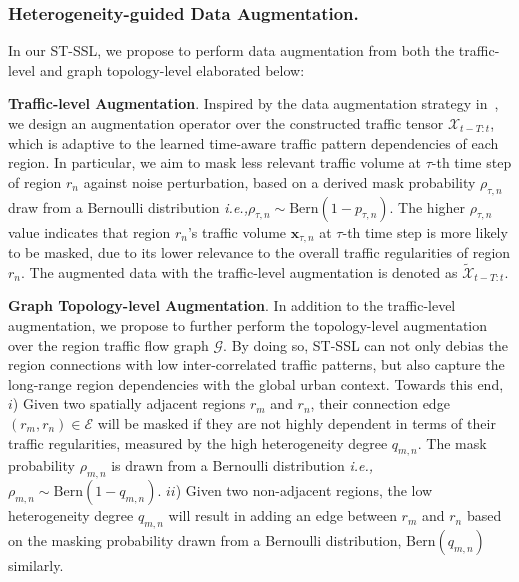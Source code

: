 \documentclass[letterpaper]{article} \usepackage{aaai23}  \usepackage{times}  \usepackage{helvet}  \usepackage{courier}  \usepackage[hyphens]{url}  \usepackage{graphicx} \urlstyle{rm} \def\UrlFont{\rm}  \usepackage{natbib}  \usepackage{caption} \frenchspacing  \setlength{\pdfpagewidth}{8.5in} \setlength{\pdfpageheight}{11in}
\newcommand{\ie}{\emph{i.e.,}\xspace}
\newcommand{\name}{ST-SSL\xspace}
\begin{document}
\subsubsection{Heterogeneity-guided Data Augmentation.}


In our \name, we propose to perform data augmentation from both the traffic-level and graph topology-level elaborated below:\\\vspace{-0.12in}



\noindent \textbf{Traffic-level Augmentation}. Inspired by the data augmentation strategy in~\cite{zhu2021graph}, we design an augmentation operator over the constructed traffic tensor $\mathcal{X}_{t-T:t}$, which is adaptive to the learned time-aware traffic pattern dependencies of each region. In particular, we aim to mask less relevant traffic volume at $\tau$-th time step of region $r_n$ against noise perturbation, based on a derived mask probability ${\rho}_{\tau,n}$ draw from a Bernoulli distribution \ie ${\rho}_{\tau,n} \sim \mathrm{Bern}(1-p_{\tau,n})$. The higher ${\rho}_{\tau,n}$ value indicates that region $r_n$'s traffic volume $\bm x_{\tau, n}$ at $\tau$-th time step is more likely to be masked, due to its lower relevance to the overall traffic regularities of region $r_n$. The augmented data with the traffic-level augmentation is denoted as $\tilde{\mathcal{X}}_{t-T:t}$.\\\vspace{-0.12in}



\noindent \textbf{Graph Topology-level Augmentation}.
In addition to the traffic-level augmentation, we propose to further perform the topology-level augmentation over the region traffic flow graph $\mathcal{G}$. By doing so, \name can not only debias the region connections with low inter-correlated traffic patterns, but also capture the long-range region dependencies with the global urban context. Towards this end, $i$) Given two spatially adjacent regions $r_m$ and $r_n$, their connection edge $(r_m, r_n) \in \mathcal{E}$ will be masked if they are not highly dependent in terms of their traffic regularities, measured by the high heterogeneity degree $q_{m,n}$. The mask probability ${\rho}_{m,n}$ is drawn from a Bernoulli distribution \ie ${\rho}_{m,n} \sim \mathrm{Bern}(1-q_{m,n})$. $ii$) Given two non-adjacent regions, the low heterogeneity degree $q_{m,n}$ will result in adding an edge between $r_m$ and $r_n$ based on the masking probability drawn from a Bernoulli distribution, $\mathrm{Bern}(q_{m,n})$ similarly.
\end{document}

